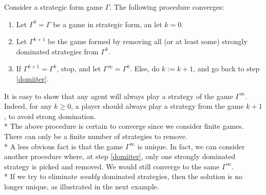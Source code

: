 \begin{procedure}
Consider a strategic form game $\Gamma$. The following procedure converges:
\begin{enumerate}
\item Let $\Gamma^0 = \Gamma $ be a game in strategic form, an let $k = 0$.
\item Let $\Gamma^{k + 1}$ be the game formed by removing all (or at least some) strongly dominated strategies from $\Gamma^k$. \label{domiiter}
\item If $\Gamma^{k+1} = \Gamma^k$, stop, and let $\Gamma^\infty = \Gamma^k$. Else, do $k := k+1$, and go back to step \ref{domiiter}.
\end{enumerate}
\label{chap2:domioutproc}
\end{procedure}

It is easy to show that any agent will always play a strategy of the game $\Gamma^{\infty}$. Indeed, for any $k \geq 0$, a player should always play a strategy from the game $k+1$, to avoid strong domination.\\*
The above procedure is certain to converge since we consider finite games. There can only be a finite number of strategies to remove. \\*
A less obvious fact is that the game $\Gamma^\infty$ is unique. In fact, we can consider another procedure where, at step \ref{domiiter}, only one strongly dominated strategy is picked and removed. We would still converge to the same $\Gamma^\infty$.\\* If we try to eliminate \emph{weakly} dominated strategies, then the solution is no longer unique, as illustrated in the next example.


